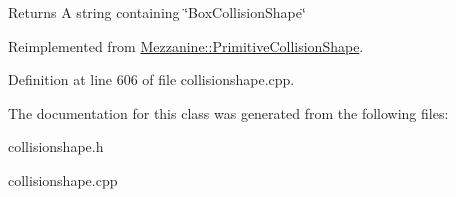 \begin{DoxyReturn}{Returns}
A string containing \char`\"{}BoxCollisionShape\char`\"{} 
\end{DoxyReturn}


Reimplemented from \hyperlink{classMezzanine_1_1PrimitiveCollisionShape_a19bb44a705ff86606834feb2783500e5}{Mezzanine::PrimitiveCollisionShape}.



Definition at line 606 of file collisionshape.cpp.



The documentation for this class was generated from the following files:\begin{DoxyCompactItemize}
\item 
collisionshape.h\item 
collisionshape.cpp\end{DoxyCompactItemize}
